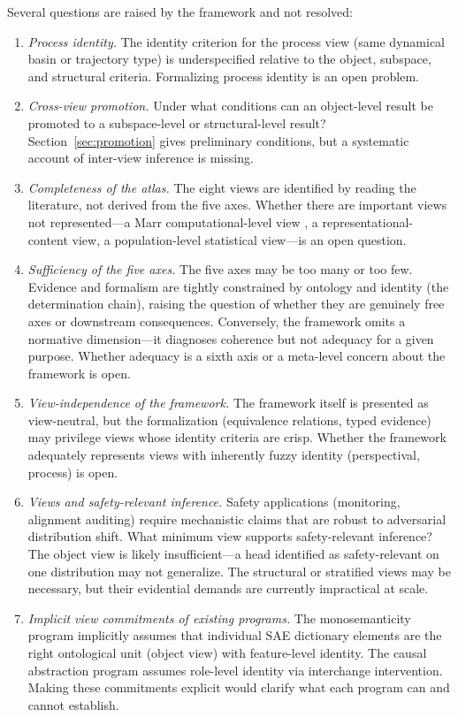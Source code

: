 \documentclass[11pt]{article}
\theoremstyle{remark}
\begin{document}
Several questions are raised by the framework and not resolved:
\begin{enumerate}[leftmargin=*]
\item \emph{Process identity.}  The identity criterion for the process
      view (same dynamical basin or trajectory type) is underspecified
      relative to the object, subspace, and structural criteria.
      Formalizing process identity is an open problem.
\item \emph{Cross-view promotion.}  Under what conditions can an
      object-level result be promoted to a subspace-level or structural-level
      result?  Section~\ref{sec:promotion} gives preliminary conditions, but
      a systematic account of inter-view inference is missing.
\item \emph{Completeness of the atlas.}  The eight views are identified
      by reading the literature, not derived from the five axes.  Whether
      there are important views not represented---a Marr computational-level
      view \citep{marr1982}, a representational-content view, a
      population-level statistical view---is an open question.
\item \emph{Sufficiency of the five axes.}  The five axes may be too many
      or too few.  Evidence and formalism are tightly constrained by
      ontology and identity (the determination chain), raising the question
      of whether they are genuinely free axes or downstream consequences.
      Conversely, the framework omits a normative dimension---it diagnoses
      coherence but not adequacy for a given purpose.  Whether adequacy
      is a sixth axis or a meta-level concern about the framework is open.
\item \emph{View-independence of the framework.}  The framework itself
      is presented as view-neutral, but the formalization (equivalence
      relations, typed evidence) may privilege views whose identity criteria
      are crisp.  Whether the framework adequately represents views with
      inherently fuzzy identity (perspectival, process) is open.
\item \emph{Views and safety-relevant inference.}  Safety applications
      (monitoring, alignment auditing) require mechanistic claims that are
      robust to adversarial distribution shift.  What minimum view supports
      safety-relevant inference?  The object view is likely insufficient---a
      head identified as safety-relevant on one distribution may not
      generalize.  The structural or stratified views may be necessary, but
      their evidential demands are currently impractical at scale.
\item \emph{Implicit view commitments of existing programs.}  The
      monosemanticity program \citep{bricken2023,templeton2024} implicitly
      assumes that individual SAE dictionary elements are the right ontological
      unit (object view) with feature-level identity.  The causal abstraction
      program \citep{geiger2021,geiger2024} assumes role-level identity via
      interchange intervention.  Making these commitments explicit would
      clarify what each program can and cannot establish.
\end{enumerate}
\end{document}
